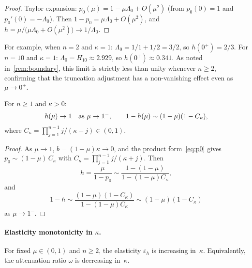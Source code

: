 \begin{proof}
  Taylor expansion: $p_0(\mu) = 1 - \mu\Lambda_0 + O(\mu^2)$
  (from $p_0(0) = 1$ and $p_0'(0) = -\Lambda_0$). Then
  $1 - p_0 = \mu\Lambda_0 + O(\mu^2)$, and
  $h = \mu\bigl/\bigl(\mu\Lambda_0 + O(\mu^2)\bigr) \to 1/\Lambda_0$.
\end{proof}

For example, when $n = 2$ and $\kappa = 1$:
$\Lambda_0 = 1/1 + 1/2 = 3/2$, so $h(0^+) = 2/3$.
For $n = 10$ and $\kappa = 1$:
$\Lambda_0 = H_{10} \approx 2.929$, so $h(0^+) \approx 0.341$.
As noted in~\cref{rem:boundary}, this limit is strictly less than
unity whenever $n \ge 2$, confirming that the truncation adjustment
has a non-vanishing effect even as $\mu \to 0^+$.

\begin{proposition}[Behavior of $h$ as $\mu \to 1^-$]
  \label{sma:prop-boundary-one}
  For $n \ge 1$ and $\kappa > 0$:
  \begin{equation}\label{sma:eq-boundary-one}
    h(\mu) \to 1 \quad \textup{as } \mu \to 1^-,
    \qquad
    1 - h(\mu) \sim (1-\mu)(1 - C_\kappa),
  \end{equation}
  where $C_\kappa = \prod_{j=1}^{n-1}j/(\kappa+j) \in (0,1)$.
\end{proposition}

\begin{proof}
  As $\mu \to 1$, $b = (1-\mu)\kappa \to 0$, and the product
  form~\eqref{eq:p0} gives $p_0 \sim (1-\mu)\,C_\kappa$ with
  $C_\kappa = \prod_{j=1}^{n-1}j/(\kappa+j)$.
  Then
  \[
    h = \frac{\mu}{1-p_0}
    \sim \frac{1 - (1-\mu)}{1 - (1-\mu)C_\kappa},
  \]
  and
  \[
    1 - h
    \sim \frac{(1-\mu)(1-C_\kappa)}{1-(1-\mu)C_\kappa}
    \sim (1-\mu)(1-C_\kappa)
  \]
  as $\mu \to 1^-$.
\end{proof}


\paragraph{Elasticity monotonicity in $\kappa$.}

\begin{conjecture}
  \label{sma:conj-elasticity-kappa}
  For fixed $\mu \in (0,1)$ and $n \ge 2$, the elasticity
  $\varepsilon_h$ is increasing in~$\kappa$. Equivalently, the
  attenuation ratio $\omega$ is decreasing in~$\kappa$.
\end{conjecture}

